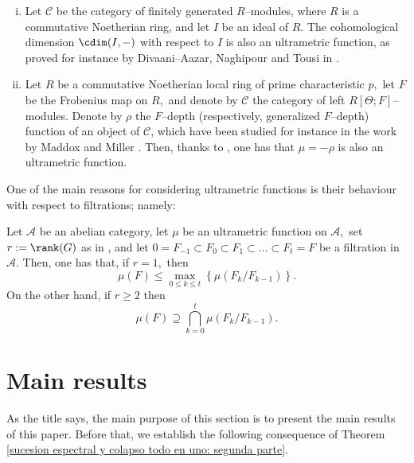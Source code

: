 \documentclass[11pt]{amsart}
\begin{document}
\begin{ex}
\begin{enumerate}[(i)]
\item Let $\mathcal{C}$ be the category of finitely generated $R$--modules, where $R$ is a commutative Noetherian ring, and let $I$ be an ideal of $R.$ The cohomological dimension $\cdim(I,-)$ with respect to $I$ is also an ultrametric function, as proved for instance by Divaani--Aazar, Naghipour and Tousi in \cite[Corollary 2.3 (i)]{DivaaniAazarNaghipourTousi2002}.

\item Let $R$ be a commutative Noetherian local ring of prime characteristic $p,$ let $F$ be the Frobenius map on $R,$ and denote by $\mathcal{C}$ the category of left $R[\Theta; F]$--modules. Denote by $\rho$ the $F$--depth (respectively, generalized $F$--depth) function of an object of $\mathcal{C}$, which have been studied for instance in the work by Maddox and Miller \cite{MaddoxMiller}. Then, thanks to \cite[Theorem 3.5]{MaddoxMiller}, one has that $\mu=-\rho$ is also an ultrametric function.

\end{enumerate}

\end{ex}
One of the main reasons for considering ultrametric functions is their behaviour with respect to filtrations; namely:

\begin{lm}
Let $\mathcal{A}$ be an abelian category, let $\mu$ be an ultrametric function on $\mathcal{A},$ set $r:=\rank (G)$ as in , and let $0=F_{-1}\subset F_0\subset F_1\subset\ldots\subset F_t=F$ be a filtration in $\mathcal{A}.$ Then, one has that, if $r=1,$ then
\[
\mu (F)\leq\max_{0\leq k\leq t}\left\{\mu\left(F_k/F_{k-1}\right)\right\}.
\]
On the other hand, if $r\geq 2$ then
\[
\mu (F)\supseteq\bigcap_{k=0}^t \mu\left(F_k/F_{k-1}\right).
\]
\end{lm}

\section{Main results}\label{section of main results}
As the title says, the main purpose of this section is to present the main results of this paper. Before that, we establish the following consequence of Theorem \ref{sucesion espectral y colapso todo en uno: segunda parte}.
\end{document}
